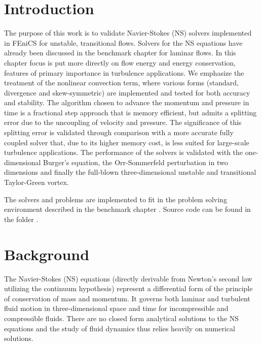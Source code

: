

\newcommand{\Hset}{FIXME: This is undefined!}
\newcommand{\Nset}{FIXME: This is undefined!}

\section{Introduction}
The purpose of this work is to validate Navier-Stokes (NS) solvers implemented in FEniCS for unstable, transitional flows. Solvers for the NS equations have already been discussed in the benchmark chapter \cite{nsbench} for laminar flows. In this chapter focus is put more directly on flow energy and energy conservation, features of primary importance in turbulence applications. We emphasize the treatment of the nonlinear convection term, where various forms (standard, divergence and skew-symmetric) are implemented and tested for both accuracy and stability. The algorithm chosen to advance the momentum and pressure in time is a fractional step approach that is memory efficient, but admits a splitting error due to the uncoupling of velocity and pressure. The significance of this splitting error is validated through comparison with a more accurate fully coupled solver that, due to its higher memory cost, is less suited for large-scale turbulence applications. The performance of the solvers is validated with the one-dimensional Burger's equation, the Orr-Sommerfeld perturbation in two dimensions and finally the full-blown three-dimensional unstable and transitional Taylor-Green vortex.

The solvers and problems are implemented to fit in the problem solving environment described in the benchmark chapter \cite{nsbench}. Source code can be found in the folder \cite{folder}.

\section{Background}

The Navier-Stokes (NS) equations (directly derivable from Newton's second law utilizing the continuum hypothesis) represent a differential form of the principle of conservation of mass and momentum. It governs both laminar and turbulent fluid motion in three-dimensional space and time for incompressible and compressible fluids. There are no closed form analytical solutions to the NS equations and the study of fluid dynamics thus relies heavily on numerical solutions.

